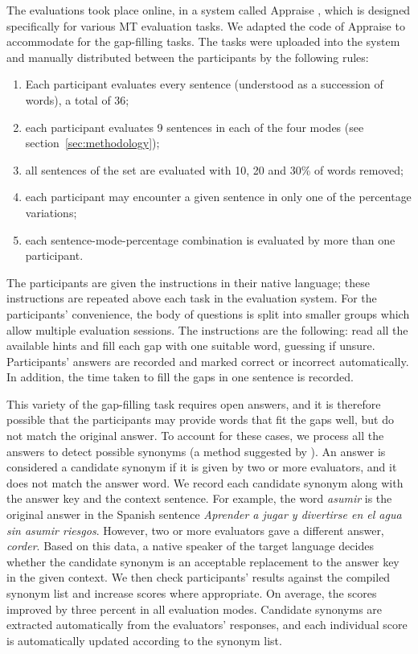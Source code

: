 \documentclass[11pt]{article}
\begin{document}
The evaluations took place online, in a system called Appraise \citep{federmann12}, which is 
designed specifically for various MT evaluation tasks. We adapted the code of Appraise to 
accommodate for the gap-filling tasks. The tasks were uploaded into the system and 
manually distributed between the participants by the following rules:
\begin{enumerate}
\item  Each participant evaluates every sentence (understood as a succession of words),
a total of 36;
\item  each participant evaluates 9 sentences in each of the four modes (see section~\ref{sec:methodology});
\item  all sentences of the set are evaluated with 10, 20 and 30\% of words removed;
\item each participant may encounter a given sentence in only one of the percentage variations;
\item  each sentence-mode-percentage combination is evaluated by more than one participant.
\end{enumerate}


The participants are given the instructions in their native language; these instructions are repeated above each task in the evaluation system. For the participants' convenience, the body of questions is split into smaller groups which allow multiple evaluation sessions. The instructions are the 
following: read all the available hints and fill each gap with one suitable word, guessing if unsure.
Participants' answers are recorded and marked correct or incorrect automatically. In
addition, the time taken to fill the gaps in one sentence is recorded.

This variety of the gap-filling task requires open answers, and it is therefore possible that the participants may
provide words that fit the gaps well, but do not match the original answer. To account for
these cases, we process all the answers to detect possible synonyms (a method suggested by \cite{oregan13}). An answer is
considered a candidate synonym if it is given by two or more evaluators, and it does not match
the answer word. We record each candidate synonym along with the answer key and the
context sentence. For example, the word \emph{asumir} is the original answer in the Spanish sentence \emph{Aprender a jugar y divertirse en el agua sin asumir riesgos}. However, two or more evaluators gave a different answer, \emph{corder}. Based on this data, a native speaker of the target language decides
whether the candidate synonym is an acceptable replacement to the answer key in the given
context. We then check participants' results against the compiled synonym list and
increase scores where appropriate. On average, the scores improved by three percent in all evaluation modes. Candidate synonyms are extracted automatically from the evaluators' responses,  and each individual score is automatically updated according to the synonym list.
\end{document}
